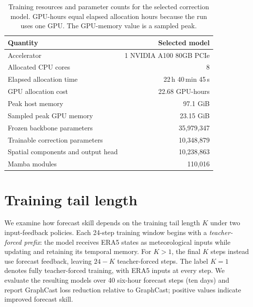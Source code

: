 \documentclass{article}
\newcommand{\vfourchange}[1]{{\color{blue}#1}}
\begin{document}
\begin{table}[!htbp]
    \centering
    \small
    \begingroup\color{blue}%
    \begin{tabular}{@{}lr@{}}
        \toprule
        Quantity & Selected model \\
        \midrule
        Accelerator & 1 NVIDIA A100 80GB PCIe \\
        Allocated CPU cores & 8 \\
        Elapsed allocation time & 22\,h 40\,min 45\,s \\
        GPU allocation cost & 22.68 GPU-hours \\
        Peak host memory & 97.1 GiB \\
        Sampled peak GPU memory & 23.15 GiB \\
        \addlinespace
        Frozen backbone parameters & 35,979,347 \\
        Trainable correction parameters & 10,348,879 \\
        \quad Spatial components and output head & 10,238,863 \\
        \quad Mamba modules & 110,016 \\
        \bottomrule
    \end{tabular}
    \endgroup%
    \caption{\vfourchange{Training resources and parameter counts for the selected correction model. GPU-hours equal elapsed allocation hours because the run uses one GPU. The GPU-memory value is a sampled peak.}}
    \label{tab:computational_resources}
\end{table}

\clearpage
\section{Training tail length}
\label{app:training_horizon}
\vfourchange{{These archived training-tail sweeps use 2022 forecasts and separate training configurations.}}

We examine how forecast skill depends on the training tail length $K$ under two input-feedback policies. Each 24-step training window begins with a \emph{teacher-forced prefix}: the model receives ERA5 states as meteorological inputs while updating and retaining its temporal memory. For $K>1$, the final $K$ steps instead use forecast feedback, leaving $24-K$ teacher-forced steps. The label $K=1$ denotes fully teacher-forced training, with ERA5 inputs at every step. We evaluate the resulting models over 40 six-hour forecast steps (ten days) and report {GraphCast loss} reduction relative to GraphCast; positive values indicate improved forecast skill.
\end{document}

